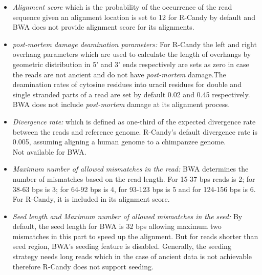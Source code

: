 \documentclass[11pt,a4paper]{report}
\begin{document}
\begin{itemize} 
 \item \emph{Alignment score}  which is the probability of the occurrence of the read sequence given an alignment location is set to 12 for R-Candy by default and BWA does not provide alignment score for its alignments.
 
 \item \emph{post-mortem damage deamination parameters:} For R-Candy the left and right overhang parameters which are used to calculate the length of overhangs by geometric distribution in 5' and 3' ends respectively are sets as zero in case the reads are not ancient and do not have \emph{post-mortem} damage.The deamination rates of cytosine residues into uracil residues for double and single stranded parts of a read are set by default 0.02 and 0.45 respectively.\\
BWA does not include \emph{post-mortem} damage at its alignment process.

 
 \item \emph{Divergence rate:} which is defined as one-third of the expected 
divergence rate between the reads and reference genome.  R-Candy's default 
divergence rate is 0.005,  assuming aligning a human genome to a chimpanzee 
genome.\\Not available for BWA.
  
  
 \item \emph{Maximum number of allowed mismatches in the read:}  BWA determines the number of mismatches based on the read length. For 15-37 bps reads is 2; for 38-63 bps is 3; for 64-92 bps is 4, for 93-123 bps is 5 and for 124-156 bps is 6\cite{bwa}.
For R-Candy, it is included in its alignment score.

 \item \emph{Seed length and Maximum number of allowed mismatches in the seed:} By default, the seed length for BWA is 32 bps allowing maximum two mismatches in this part to speed up the alignment. But for reads shorter than seed region, BWA's seeding feature is disabled.
Generally, the seeding strategy needs long reads which in the case of ancient data is not achievable therefore R-Candy does not support seeding.
 

\end{itemize} 
\end{document}
